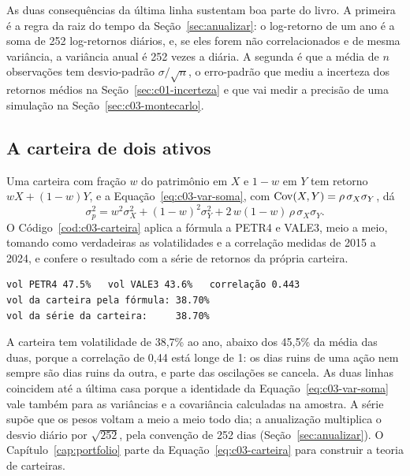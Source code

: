 As duas consequências da última linha sustentam boa parte do livro. A primeira é a regra da raiz do tempo da Seção~\ref{sec:anualizar}: o log-retorno de um ano é a soma de 252 log-retornos diários, e, se eles forem não correlacionados e de mesma variância, a variância anual é 252 vezes a diária. A segunda é que a média de $n$ observações tem desvio-padrão $\sigma/\sqrt{n}$, o erro-padrão que mediu a incerteza dos retornos médios na Seção~\ref{sec:c01-incerteza} e que vai medir a precisão de uma simulação na Seção~\ref{sec:c03-montecarlo}.

\subsection{A carteira de dois ativos}

Uma carteira com fração $w$ do patrimônio em $X$ e $1-w$ em $Y$ tem retorno $wX + (1-w)Y$, e a Equação~\eqref{eq:c03-var-soma}, com $\operatorname{Cov}(X,Y) = \rho\,\sigma_X\sigma_Y$, dá
\begin{equation}
  \sigma_p^2 = w^2\sigma_X^2 + (1-w)^2\sigma_Y^2 + 2\,w(1-w)\,\rho\,\sigma_X\sigma_Y .
  \label{eq:c03-carteira}
\end{equation}
O Código~\ref{cod:c03-carteira} aplica a fórmula a PETR4 e VALE3, meio a meio, tomando como verdadeiras as volatilidades e a correlação medidas de 2015 a 2024, e confere o resultado com a série de retornos da própria carteira.


\begin{lstlisting}[style=saida]
vol PETR4 47.5%   vol VALE3 43.6%   correlação 0.443
vol da carteira pela fórmula: 38.70%
vol da série da carteira:     38.70%
\end{lstlisting}

A carteira tem volatilidade de 38,7\% ao ano, abaixo dos 45,5\% da média das duas, porque a correlação de 0,44 está longe de 1: os dias ruins de uma ação nem sempre são dias ruins da outra, e parte das oscilações se cancela. As duas linhas coincidem até a última casa porque a identidade da Equação~\eqref{eq:c03-var-soma} vale também para as variâncias e a covariância calculadas na amostra. A série  supõe que os pesos voltam a meio a meio todo dia; a anualização multiplica o desvio diário por $\sqrt{252}$, pela convenção de 252 dias (Seção~\ref{sec:anualizar}). O Capítulo~\ref{cap:portfolio} parte da Equação~\eqref{eq:c03-carteira} para construir a teoria de carteiras.

